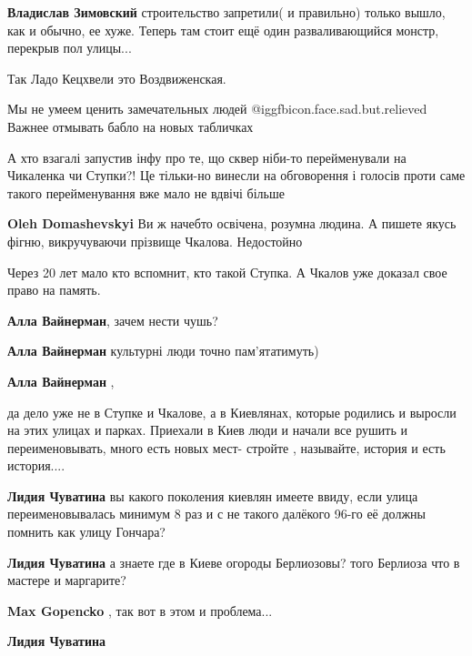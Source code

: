 \begin{itemize}
\begin{itemize}
\textbf{Владислав Зимовский} строительство запретили( и правильно) только вышло, как и обычно, ее хуже. Теперь там стоит ещё один разваливающийся монстр, перекрыв пол улицы...
\end{itemize} %

Так Ладо Кецхвели это Воздвиженская.

Мы не умеем ценить замечательных людей @igg{fbicon.face.sad.but.relieved}  Важнее отмывать бабло на новых табличках


А хто взагалі запустив інфу про те, що сквер ніби-то перейменували на Чикаленка
чи Ступки?! Це тільки-но винесли на обговорення і голосів проти саме такого
перейменування вже мало не вдвічі більше

\begin{itemize} %
\textbf{Oleh Domashevskyi} Ви ж начебто освічена, розумна людина. А пишете якусь фігню, викручуваючи прізвище Чкалова. Недостойно
\end{itemize} %

Через 20 лет мало кто вспомнит, кто такой Ступка. А Чкалов уже доказал свое право на память.

\begin{itemize} %
\textbf{Алла Вайнерман}, зачем нести чушь?

\textbf{Алла Вайнерман} культурні люди точно пам'ятатимуть)

\textbf{Алла Вайнерман} , 

да дело уже не в Ступке и Чкалове, а в Киевлянах, которые родились и выросли на
этих улицах и парках. Приехали в Киев люди и начали все рушить и
переименовывать, много есть новых мест- стройте , называйте, история и есть
история....

\begin{itemize} %
\textbf{Лидия Чуватина} вы какого поколения киевлян имеете ввиду, если улица переименовывалась минимум 8 раз и с не такого далёкого 96-го её должны помнить как улицу Гончара?

\textbf{Лидия Чуватина} а знаете где в Киеве огороды Берлиозовы? того Берлиоза что в мастере и маргарите?

\textbf{Max Gopencko} , так вот в этом и проблема...

\textbf{Лидия Чуватина} 


\end{itemize}
\end{itemize}
\end{itemize}
